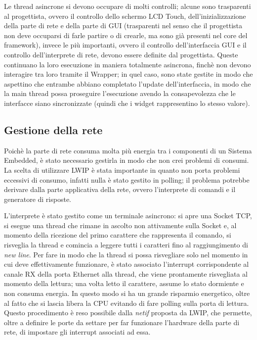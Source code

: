 \documentclass[journal]{IEEEtran}
\begin{document}
Le thread asincrone si devono occupare di molti controlli; alcune sono trasparenti al progettista, ovvero il controllo dello schermo LCD Touch, dell'inizializzazione della parte di rete e della parte di GUI (trasparenti nel senso che il progettista non deve occuparsi di farle partire o di crearle, ma sono già presenti nel core del framework), invece le più importanti, ovvero il controllo dell'interfaccia GUI e il controllo dell'interprete di rete, devono essere definite dal progettista. Queste continuano la loro esecuzione in maniera totalmente asincrona, finchè non devono interagire tra loro tramite il Wrapper; in quel caso, sono state gestite in modo che aspettino che entrambe abbiano completato l'update dell'interfaccia, in modo che la main thread possa proseguire l'esecuzione avendo la consapevolezza che le interfacce siano sincronizzate (quindi che i widget rappresentino lo stesso valore).

\subsection{Gestione della rete}

Poichè la parte di rete consuma molta più energia tra i componenti di un Sistema Embedded, è stato necessario gestirla in modo che non crei problemi di consumi. La scelta di utilizzare LWIP è stata importante in quanto non porta problemi eccessivi di consumo, infatti nulla è stato gestito in polling; il problema potrebbe derivare dalla parte applicativa della rete, ovvero l'interprete di comandi e il generatore di risposte.

L'interprete è stato gestito come un terminale asincrono: si apre una Socket TCP, si esegue una thread che rimane in ascolto non attivamente sulla Socket e, al momento della ricezione del primo carattere che rappresenta il comando, si risveglia la thread e comincia a leggere tutti i caratteri fino al raggiungimento di \textit{new line}. Per fare in modo che la thread si possa risvegliare solo nel momento in cui deve effettivamente funzionare, è stato associato l'interrupt corrispondente al canale RX della porta Ethernet alla thread, che viene prontamente risvegliata al momento della lettura; una volta letto il carattere, assume lo stato dormiente e non consuma energia. In questo modo si ha un grande risparmio energetico, oltre al fatto che si lascia libera la CPU evitando di fare polling sulla porta di lettura. Questo procedimento è reso possibile dalla \textit{netif} proposta da LWIP, che permette, oltre a definire le porte da settare per far funzionare l'hardware della parte di rete, di impostare gli interrupt associati ad essa. 
\end{document}
